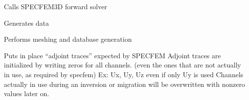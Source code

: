 \documentclass[letterpaper,10pt,english]{sphinxmanual}
\begin{document}
\begin{fulllineitems}

\begin{fulllineitems}
\label{\detokenize{ref/seisflows.solver:seisflows.solver.specfem3d.specfem3d.forward}}
Calls SPECFEM3D forward solver

\end{fulllineitems}


\begin{fulllineitems}
\label{\detokenize{ref/seisflows.solver:seisflows.solver.specfem3d.specfem3d.generate_data}}
Generates data

\end{fulllineitems}


\begin{fulllineitems}
\label{\detokenize{ref/seisflows.solver:seisflows.solver.specfem3d.specfem3d.generate_mesh}}
Performs meshing and database generation

\end{fulllineitems}


\begin{fulllineitems}
\label{\detokenize{ref/seisflows.solver:seisflows.solver.specfem3d.specfem3d.initialize_adjoint_traces}}
Puts in place “adjoint traces” expected by SPECFEM
Adjoint traces are initialized by writing zeros for all channels.
(even the ones that are not actually in use, as required by
specfem) Ex: Ux, Uy, Uz even if only Uy is used
Channels actually in use during an inversion or migration will be
overwritten with nonzero values later on.


\end{fulllineitems}
\end{fulllineitems}
\end{document}
